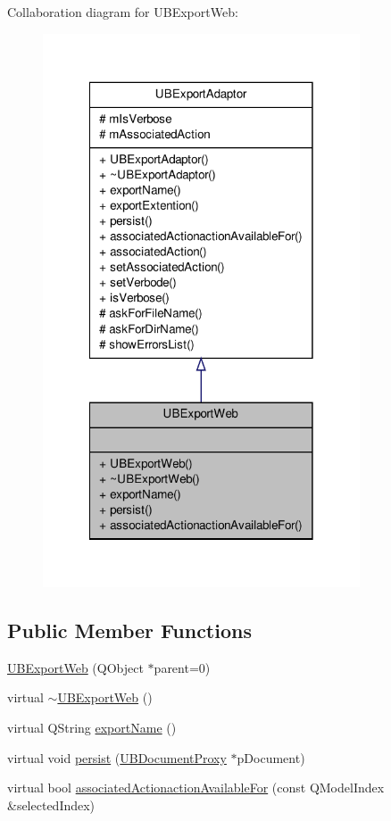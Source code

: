 Collaboration diagram for U\-B\-Export\-Web\-:
\nopagebreak
\begin{figure}[H]
\begin{center}
\leavevmode
\includegraphics[width=266pt]{d5/d50/class_u_b_export_web__coll__graph}
\end{center}
\end{figure}
\subsection*{Public Member Functions}
\begin{DoxyCompactItemize}
\item 
\hyperlink{class_u_b_export_web_a8ed2c4f499bbc9a61c1a0d53113a4b55}{U\-B\-Export\-Web} (Q\-Object $\ast$parent=0)
\item 
virtual \hyperlink{class_u_b_export_web_a14d5780569cf6c8041795c79fb2d3859}{$\sim$\-U\-B\-Export\-Web} ()
\item 
virtual Q\-String \hyperlink{class_u_b_export_web_a937545710e262d96806de46af36adf1b}{export\-Name} ()
\item 
virtual void \hyperlink{class_u_b_export_web_aefd31533540499d2023dc071262ebdd4}{persist} (\hyperlink{class_u_b_document_proxy}{U\-B\-Document\-Proxy} $\ast$p\-Document)
\item 
virtual bool \hyperlink{class_u_b_export_web_a82645ed3a13ef9d6c6864c221960fe52}{associated\-Actionaction\-Available\-For} (const Q\-Model\-Index \&selected\-Index)
\end{DoxyCompactItemize}
